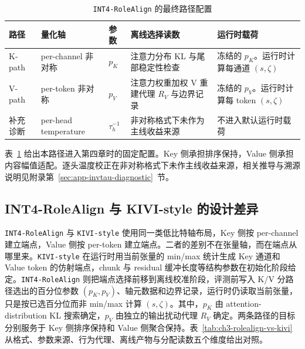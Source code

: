 

\begin{table}[!htbp]
  \centering
  \caption{\texttt{INT4-RoleAlign} 的最终路径配置}
  \label{tab:ch3-rolealign-final-config}
  \scriptsize
  \setlength{\tabcolsep}{3.2pt}
  \renewcommand{\arraystretch}{1.10}
  \begin{tabularx}{\linewidth}{>{\raggedright\arraybackslash}p{1.15cm}>{\raggedright\arraybackslash}p{2.0cm}>{\raggedright\arraybackslash}p{1.5cm}>{\raggedright\arraybackslash}p{2.5cm}X}
    \toprule
    路径 & 量化轴 & 参数 & 离线选择读数 & 运行时载荷 \\
    \midrule
    K-path & per-channel 非对称 & $p_K$ & 注意力分布 KL 与尾部稳定性检查 & 冻结的 $p_K$。运行时计算每通道 $(s,\zeta)$ \\
    V-path & per-token 非对称 & $p_V$ & 注意力权重加权 V 重建代理 $R_V$ 与边界记录 & 冻结的 $p_V$。运行时计算每 token $(s,\zeta)$ \\
    补充诊断 & per-head temperature & $\tau_h^{-1}$ & 非对称格式下未作为主线收益来源 & 不进入默认运行时载荷 \\
    \bottomrule
  \end{tabularx}
\end{table}

表~\ref{tab:ch3-rolealign-final-config} 给出本路径进入第四章时的固定配置。Key 侧承担排序保持，Value 侧承担内容幅值适配。逐头温度校正在非对称格式下未作主线收益来源，相关推导与溯源说明见附录第~\ref{sec:app-invtau-diagnostic}~节。

\subsection{INT4-RoleAlign 与 KIVI-style 的设计差异}
\label{subsec:ch3-rolealign-vs-kivi}

\texttt{INT4-RoleAlign} 与 \texttt{KIVI-style} 使用同一类低比特轴布局，Key 侧按 per-channel 建立端点，Value 侧按 per-token 建立端点。二者的差别不在张量轴，而在端点从哪里来。\texttt{KIVI-style} 在运行时用当前张量的 min/max 统计生成 Key 通道和 Value token 的仿射端点，chunk 与 residual 缓冲长度等结构参数在初始化阶段给定。\texttt{INT4-RoleAlign} 则把端点选择前移到离线校准阶段，评测前写入 K/V 分路径选出的百分位参数 $(p_K,p_V)$、轴元数据和边界记录，运行时仍读取当前张量，只是按已选百分位而非 min/max 计算 $(s,\zeta)$。其中，$p_K$ 由 attention-distribution KL 搜索确定，$p_V$ 由独立的输出扰动代理 $R_V$ 确定。两条路径的目标分别服务于 Key 侧排序保持和 Value 侧聚合保持。表~\ref{tab:ch3-rolealign-vs-kivi} 从格式、参数来源、行为代理、离线产物与分配读数五个维度给出对照。

